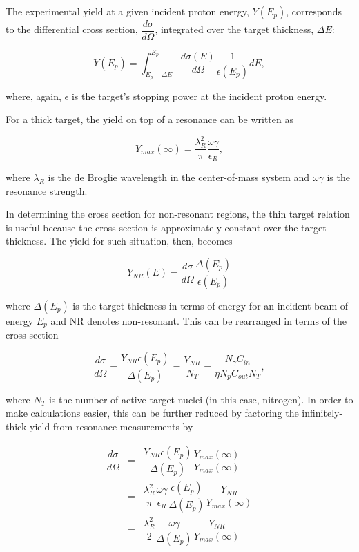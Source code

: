 The experimental yield at a given incident proton energy, $Y(E_{p})$, corresponds to the differential cross section, $\dfrac{d \sigma}{d \Omega}$, integrated over the target thickness, $\Delta E$:

\begin{equation}
Y(E_{p}) = \int_{E_{p} - \Delta E}^{E_{p}} \dfrac{d \sigma(E)}{d \Omega} \dfrac{1}{\epsilon(E_{p})} dE,
\label{eqn: yieldCS}
\end{equation}

\noindent where, again, $\epsilon$ is the target's stopping power at the incident proton energy. 

For a thick target, the yield on top of a resonance can be written as

\begin{equation}
Y_{max}(\infty) = \dfrac{\lambda_{R}^{2}}{\pi} \dfrac{\omega \gamma}{\epsilon_{R}},
\end{equation}

\noindent where $\lambda_{R}$ is the de Broglie wavelength in the center-of-mass system and $\omega \gamma$ is the resonance strength. 



In determining the cross section for non-resonant regions, the thin target relation is useful because the cross section is approximately constant over the target thickness. The yield for such situation, then, becomes

\begin{equation}
Y_{NR}(E) = \dfrac{d \sigma}{d \Omega} \dfrac{\Delta(E_{p})}{\epsilon(E_{p})}
\end{equation}

\noindent where $\Delta(E_{p})$ is the target thickness in terms of energy for an incident beam of energy $E_{p}$ and NR denotes non-resonant. This can be rearranged in terms of the cross section

\begin{equation}
\dfrac{d \sigma}{d \Omega} = \dfrac{Y_{NR} \epsilon(E_{p})}{\Delta(E_{p})} = \dfrac{Y_{NR}}{N_{T}} = \dfrac{N_{\gamma}C_{in}} {\eta  N_{p} C_{out} N_{T}},
\label{eqn: thinTargetCS}
\end{equation}

\noindent where $N_{T}$ is the number of active target nuclei (in this case, nitrogen). In order to make calculations easier, this can be further reduced by factoring the infinitely-thick yield from resonance measurements by

\begin{eqnarray}
\dfrac{d \sigma}{d \Omega} &=& \dfrac{Y_{NR} \epsilon(E_{p})}{\Delta(E_{p})} \dfrac{Y_{max}(\infty)}{Y_{max}(\infty)} \\
   &=& \dfrac{\lambda_{R}^{2}}{\pi} \dfrac{\omega \gamma}{\epsilon_{R}} \dfrac{\epsilon(E_{p})}{\Delta(E_{p})} \dfrac{Y_{NR}}{Y_{max}(\infty)} \\
   &=& \dfrac{\lambda_{R}^{2}}{2} \dfrac{\omega \gamma}{\Delta(E_{p})} \dfrac{Y_{NR}}{Y_{max}(\infty)} 
\end{eqnarray}

